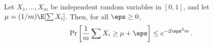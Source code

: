 \begin{lemma}
  \label{lemma:chernoff}
  Let $X_1, \ldots, X_m$ be independent random variables in $[0,1]$, and let
  $\mu = ({1}/{m}) \E[ \sum X_i]$.  Then, for all $\eps \ge 0$,
  $$
  \Pr\left[ \frac{1}{m} \sum X_i \ge \mu + \eps \right] \le e^{-2\eps^2 m}\,.
  $$
\end{lemma}
